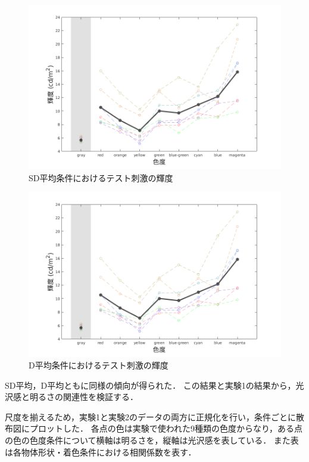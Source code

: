     \begin{figure}[h]
        \centering
        \includegraphics[width=14.0cm]{./img/ex2_res_SD_p.png}
        \caption{SD平均条件におけるテスト刺激の輝度}
        \label{ex2_SD}
    \end{figure}

    \begin{figure}[h]
        \centering
        \includegraphics[width=14.0cm]{./img/ex2_res_SD_p.png}
        \caption{D平均条件におけるテスト刺激の輝度}
        \label{ex2_D}
    \end{figure}

    SD平均，D平均ともに同様の傾向が得られた．
    この結果と実験1の結果から，光沢感と明るさの関連性を検証する．

    尺度を揃えるため，実験1と実験2のデータの両方に正規化を行い，条件ごとに散布図にプロットした．
    各点の色は実験で使われた9種類の色度からなり，ある点の色の色度条件について横軸は明るさを，縦軸は光沢感を表している．
    また表は各物体形状・着色条件における相関係数を表す．

